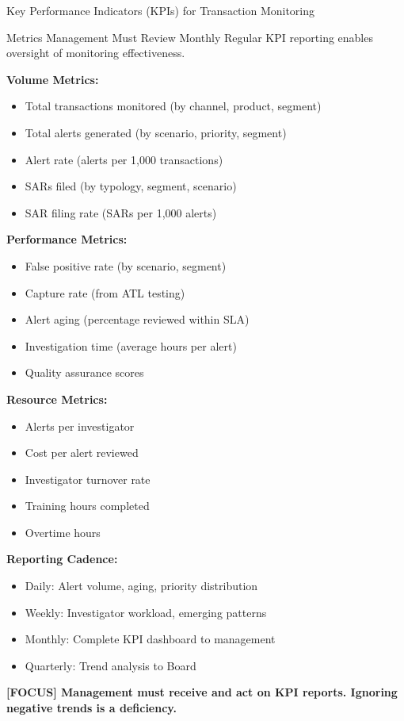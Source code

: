 \documentclass[11pt,a4paper]{beamer}
\newcommand{\examfocus}[1]{\textcolor{orange!80!black}{\textbf{[FOCUS] #1}}}
\begin{document}
	\begin{frame}{Key Performance Indicators (KPIs) for Transaction Monitoring}
	\begin{block}{Metrics Management Must Review Monthly}
		Regular KPI reporting enables oversight of monitoring effectiveness.
	\end{block}
	
	\textbf{Volume Metrics:}
	\begin{itemize}
		\item Total transactions monitored (by channel, product, segment)
		\item Total alerts generated (by scenario, priority, segment)
		\item Alert rate (alerts per 1,000 transactions)
		\item SARs filed (by typology, segment, scenario)
		\item SAR filing rate (SARs per 1,000 alerts)
	\end{itemize}
	
	\textbf{Performance Metrics:}
	\begin{itemize}
		\item False positive rate (by scenario, segment)
		\item Capture rate (from ATL testing)
		\item Alert aging (percentage reviewed within SLA)
		\item Investigation time (average hours per alert)
		\item Quality assurance scores
	\end{itemize}
	
	\textbf{Resource Metrics:}
	\begin{itemize}
		\item Alerts per investigator
		\item Cost per alert reviewed
		\item Investigator turnover rate
		\item Training hours completed
		\item Overtime hours
	\end{itemize}
	
	\textbf{Reporting Cadence:}
	\begin{itemize}
		\item Daily: Alert volume, aging, priority distribution
		\item Weekly: Investigator workload, emerging patterns
		\item Monthly: Complete KPI dashboard to management
		\item Quarterly: Trend analysis to Board
	\end{itemize}
	
	\examfocus{Management must receive and act on KPI reports. Ignoring negative trends is a deficiency.}
	\end{frame}
	
\end{document}

